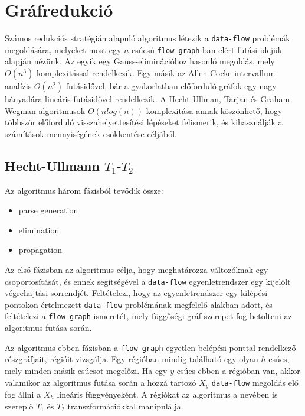 \documentclass[12pt,a4paper]{article}
\begin{document}
\section{Gráfredukció}

Számos redukciós stratégián alapuló algoritmus létezik a \texttt{data-flow} problémák megoldására, melyeket most egy $n$ csúcsú \texttt{flow-graph}-ban elért futási idejük alapján nézünk. Az egyik egy Gauss-eliminációhoz hasonló megoldás, mely $O(n^{3})$ komplexitással rendelkezik. Egy másik az Allen-Cocke intervallum analízis $O(n^{2})$ futásidővel, bár a gyakorlatban előforduló gráfok egy nagy hányadára lineáris futásidővel rendelkezik. A Hecht-Ullman, Tarjan és Graham-Wegman algoritmusok $O(nlog(n))$ komplexitása annak köszönhető, hogy többször előforduló visszahelyettesítési lépéseket felismerik, és kihasználják a számítások mennyiségének csökkentése céljából.

\subsection{Hecht-Ullmann $T_1$-$T_2$}

Az algoritmus három fázisból tevődik össze:
\begin{itemize}
\item parse generation
\item elimination
\item propagation
\end{itemize}
Az első fázisban az algoritmus célja, hogy meghatározza változóknak egy csoportosítását, és ennek segítségével a \texttt{data-flow} egyenletrendszer egy kijelölt végrehajtási sorrendjét. Feltételezi, hogy az egyenletrendszer egy kilépési pontokon értelmezett \texttt{data-flow} problémának megfelelő alakban adott, és feltételezi a \texttt{flow-graph} ismeretét, mely függőségi gráf szerepet fog betölteni az algoritmus futása során.

Az algoritmus ebben fázisban a \texttt{flow-graph} egyetlen belépési ponttal rendelkező részgráfjait, régióit vizsgálja. Egy régióban mindig található egy olyan $h$ csúcs, mely minden másik csúcsot megelőzi. Ha egy $y$ csúcs ebben a régióban van, akkor valamikor az algoritmus futása során a hozzá tartozó $X_y$ \texttt{data-flow} megoldás elő fog állni a $X_h$ lineáris függvényeként. A régiókat az algoritmus a nevében is szereplő $T_1$ és $T_2$ transzformációkkal manipulálja. 
\end{document}
